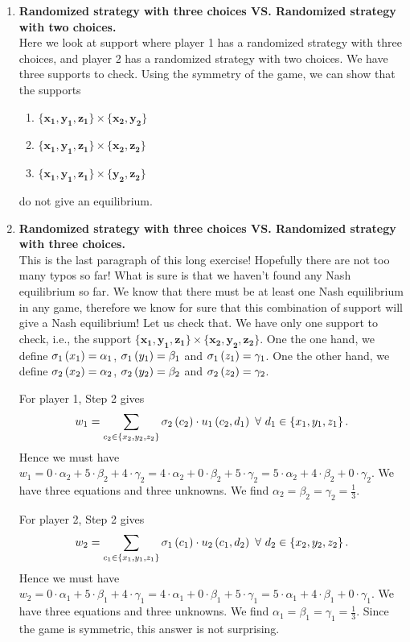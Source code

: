 \begin{enumerate} [label=\Alph*. ]
\item \textbf{Randomized strategy with three choices VS. Randomized strategy with two choices.} \\
Here we look at support where player 1 has a randomized strategy with three choices, and player 2 has a randomized strategy with two choices. We have three supports to check. Using the symmetry of the game, we can show that the supports
\begin{enumerate} [label*= (\arabic*)]
    \item $\mathbf{\{x_1, y_1, z_1\}} \times \mathbf{\{x_2, y_2\}}$
    \item $\mathbf{\{x_1, y_1, z_1\}} \times \mathbf{\{x_2, z_2\}}$
    \item $\mathbf{\{x_1, y_1, z_1\}} \times \mathbf{\{y_2, z_2\}}$
\end{enumerate}

do not give an equilibrium.

\item \textbf{Randomized strategy with three choices VS. Randomized strategy with three choices.} \\
This is the last paragraph of this long exercise! Hopefully there are not too many typos so far! What is sure is that we haven't found any Nash equilibrium so far. We know that there must be at least one Nash equilibrium in any game, therefore we know for sure that this combination of support will give a Nash equilibrium! Let us check that. We have only one support to check, i.e., the support $\mathbf{\{x_1, y_1, z_1\}} \times \mathbf{\{x_2, y_2, z_2\}}$.
One the one hand, we define $\sigma_{1} \left(x_1\right) = \alpha_1$, $\sigma_{1} \left(y_1\right) = \beta_1$ and $\sigma_{1} \left(z_1\right) = \gamma_1$.
One the other hand, we define $\sigma_{2} \left(x_2\right) = \alpha_2$, $\sigma_{2} \left(y_2\right) = \beta_2$ and $\sigma_{2} \left(z_2\right) = \gamma_2$.

For player 1, Step 2 gives
\begin{equation*}
    w_1 = \sum_{c_2 \in \left\{x_2, y_2, z_2\right\}} \sigma_{2} \left(c_2\right) \cdot u_1 \left(c_2, d_1\right) \ \forall \ d_1 \in \left\{x_1, y_1, z_1\right\}.
\end{equation*}
Hence we must have $w_1 = 0 \cdot \alpha_2 + 5 \cdot \beta_2 + 4 \cdot \gamma_2
= 4 \cdot \alpha_2 + 0 \cdot \beta_2 + 5 \cdot \gamma_2
= 5 \cdot \alpha_2 + 4 \cdot \beta_2 + 0 \cdot \gamma_2$. We have three equations and three unknowns. We find $\alpha_2 = \beta_2 = \gamma_2 = \frac{1}{3}$.

For player 2, Step 2 gives
\begin{equation*}
    w_2 = \sum_{c_1 \in \left\{x_1, y_1, z_1\right\}} \sigma_{1} \left(c_1\right) \cdot u_2 \left(c_1, d_2\right) \ \forall \ d_2 \in \left\{x_2, y_2, z_2\right\}.
\end{equation*}
Hence we must have $w_2 = 0 \cdot \alpha_1 + 5 \cdot \beta_1 + 4 \cdot \gamma_1
= 4 \cdot \alpha_1 + 0 \cdot \beta_1 + 5 \cdot \gamma_1
= 5 \cdot \alpha_1 + 4 \cdot \beta_1 + 0 \cdot \gamma_1$. We have three equations and three unknowns. We find $\alpha_1 = \beta_1 = \gamma_1 = \frac{1}{3}$. Since the game is symmetric, this answer is not surprising. 


\end{enumerate}

